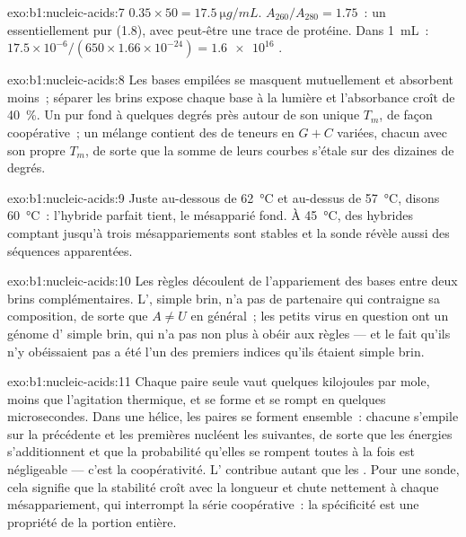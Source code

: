 \begin{solution}{exo:b1:nucleic-acids:7}
$0.35\times 50 = \qty{17.5}{\micro g/mL}$. $A_{260}/A_{280} = 1.75$~:
un  essentiellement pur (1.8), avec peut-être une trace de protéine.
Dans \qty{1}{mL}~: $17.5\times 10^{-6}/(650\times 1.66\times 10^{-24}) =
\num{1.6e16}$ .
\end{solution}

\begin{solution}{exo:b1:nucleic-acids:8}
Les bases empilées se masquent mutuellement et absorbent moins~;
séparer les brins expose chaque base à la lumière et l'absorbance croît
de \qty{40}{\%}. Un  pur fond à quelques degrés près autour de son
unique $T_m$, de façon coopérative~; un mélange contient des  de
teneurs en $G + C$ variées, chacun avec son propre $T_m$, de sorte que
la somme de leurs courbes s'étale sur des dizaines de degrés.
\end{solution}

\begin{solution}{exo:b1:nucleic-acids:9}
Juste au-dessous de \qty{62}{\celsius} et au-dessus de
\qty{57}{\celsius}, disons \qty{60}{\celsius}~: l'hybride parfait tient,
le mésapparié fond. À \qty{45}{\celsius}, des hybrides comptant jusqu'à
trois mésappariements sont stables et la sonde révèle aussi des
séquences apparentées.
\end{solution}

\begin{solution}{exo:b1:nucleic-acids:10}
Les règles découlent de l'appariement des bases entre deux brins
complémentaires. L', simple brin, n'a pas de partenaire qui
contraigne sa composition, de sorte que $A \neq U$ en général~; les
petits virus en question ont un génome d' simple brin, qui n'a pas
non plus à obéir aux règles --- et le fait qu'ils n'y obéissaient pas a
été l'un des premiers indices qu'ils étaient simple brin.
\end{solution}

\begin{solution}{exo:b1:nucleic-acids:11}
Chaque paire seule vaut quelques kilojoules par mole, moins que
l'agitation thermique, et se forme et se rompt en quelques
microsecondes. Dans une hélice, les paires se forment ensemble~: chacune
s'empile sur la précédente et les premières nucléent les suivantes, de
sorte que les énergies s'additionnent et que la probabilité qu'elles se
rompent toutes à la fois est négligeable --- c'est la coopérativité.
L' contribue autant que les . Pour une
sonde, cela signifie que la stabilité croît avec la longueur et chute
nettement à chaque mésappariement, qui interrompt la série coopérative~:
la spécificité est une propriété de la portion entière.
\end{solution}

